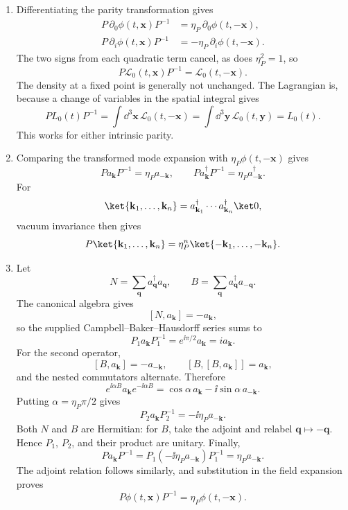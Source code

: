 \begin{enumerate}
\begin{enumerate}
\item[(a)] Differentiating the parity transformation gives
\[
\begin{aligned}
 P\,\partial_0\phi(t,\mathbf x)P^{-1}
 &=\eta_P\,\partial_0\phi(t,-\mathbf x),\\
 P\,\partial_i\phi(t,\mathbf x)P^{-1}
 &=-\eta_P\,\partial_i\phi(t,-\mathbf x).
\end{aligned}
\]
The two signs from each quadratic term cancel, as does
\(\eta_P^2=1\), so
\[
 P\mathcal L_0(t,\mathbf x)P^{-1}=\mathcal L_0(t,-\mathbf x).
\]
The density at a fixed point is generally not unchanged.  The
Lagrangian is, because a change of variables in the spatial integral
gives
\[
 P L_0(t)P^{-1}
 =\int \dd^3\mathbf x\,\mathcal L_0(t,-\mathbf x)
 =\int \dd^3\mathbf y\,\mathcal L_0(t,\mathbf y)
 =L_0(t).
\]
This works for either intrinsic parity.

\item[(b)] Comparing the transformed mode expansion with
\(\eta_P\phi(t,-\mathbf x)\) gives
\[
 Pa_{\mathbf k}P^{-1}=\eta_Pa_{-\mathbf k},
 \qquad
 Pa_{\mathbf k}^\dagger P^{-1}=\eta_Pa_{-\mathbf k}^\dagger.
\]
For
\[
 \ket{\mathbf k_1,\ldots,\mathbf k_n}
 =a_{\mathbf k_1}^\dagger\cdots
  a_{\mathbf k_n}^\dagger\ket0,
\]
vacuum invariance then gives
\[
 P\ket{\mathbf k_1,\ldots,\mathbf k_n}
 =\eta_P^n\ket{-\mathbf k_1,\ldots,-\mathbf k_n}.
\]

\item[(c)] Let
\[
 N=\sum_{\mathbf q}a_{\mathbf q}^\dagger a_{\mathbf q},
 \qquad
 B=\sum_{\mathbf q}a_{\mathbf q}^\dagger a_{-\mathbf q}.
\]
The canonical algebra gives
\[
 [N,a_{\mathbf k}]=-a_{\mathbf k},
\]
so the supplied Campbell--Baker--Hausdorff series sums to
\[
 P_1a_{\mathbf k}P_1^{-1}
 =e^{\ii\pi/2}a_{\mathbf k}=ia_{\mathbf k}.
\]
For the second operator,
\[
 [B,a_{\mathbf k}]=-a_{-\mathbf k},\qquad
 [B,[B,a_{\mathbf k}]]=a_{\mathbf k},
\]
and the nested commutators alternate.  Therefore
\[
 e^{\ii\alpha B}a_{\mathbf k}e^{-\ii\alpha B}
 =\cos\alpha\,a_{\mathbf k}
 -\ii\sin\alpha\,a_{-\mathbf k}.
\]
Putting \(\alpha=\eta_P\pi/2\) gives
\[
 P_2a_{\mathbf k}P_2^{-1}=-\ii\eta_Pa_{-\mathbf k}.
\]
Both \(N\) and \(B\) are Hermitian: for \(B\), take the adjoint and
relabel \(\mathbf q\mapsto-\mathbf q\).  Hence \(P_1\), \(P_2\), and
their product are unitary.  Finally,
\[
 Pa_{\mathbf k}P^{-1}
 =P_1(-\ii\eta_Pa_{-\mathbf k})P_1^{-1}
 =\eta_Pa_{-\mathbf k}.
\]
The adjoint relation follows similarly, and substitution in the field
expansion proves
\[
 P\phi(t,\mathbf x)P^{-1}=\eta_P\phi(t,-\mathbf x).
\]


\end{enumerate}
\end{enumerate}
